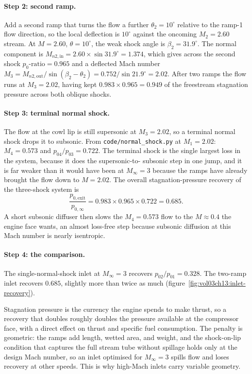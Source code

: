 \paragraph{Step 2: second ramp.} Add a second ramp that turns the flow
a further $\theta_2 = 10^{\circ}$ relative to the ramp-1 flow
direction, so the local deflection is $10^{\circ}$ against the
oncoming $M_2 = 2.60$ stream. At $M = 2.60$, $\theta = 10^{\circ}$, the
weak shock angle is $\beta_2 = 31.9^{\circ}$. The normal component is
$M_{n2,\text{in}} = 2.60 \times \sin 31.9^{\circ} = 1.374$, which gives
across the second shock $p_{0}\text{-ratio} = 0.965$ and a deflected
Mach number $M_3 = M_{n2,\text{out}}/\sin(\beta_2 - \theta_2) =
0.752/\sin 21.9^{\circ} = 2.02$. After two ramps the flow runs at
$M_3 = 2.02$, having kept $0.983 \times 0.965 = 0.949$ of the
freestream stagnation pressure across both oblique shocks.



\paragraph{Step 3: terminal normal shock.} The flow at the cowl lip is
still supersonic at $M_3 = 2.02$, so a terminal normal shock drops it
to subsonic. From \texttt{code/normal\_shock.py} at $M_1 = 2.02$:
$M_4 = 0.573$ and $p_{04}/p_{03} = 0.722$. The terminal shock is the
single largest loss in the system, because it does the supersonic-to-
subsonic step in one jump, and it is far weaker than it would have been
at $M_\infty = 3$ because the ramps have already brought the flow down
to $M = 2.02$. The overall stagnation-pressure recovery of the
three-shock system is
\[
\frac{p_{0,\text{exit}}}{p_{0,\infty}} = 0.983 \times 0.965 \times
0.722 = 0.685.
\]
A short subsonic diffuser then slows the $M_4 = 0.573$ flow to the
$M \approx 0.4$ the engine face wants, an almost loss-free step because
subsonic diffusion at this Mach number is nearly isentropic.

\paragraph{Step 4: the comparison.} The single-normal-shock inlet at
$M_\infty = 3$ recovers $p_{02}/p_{01} = 0.328$. The two-ramp inlet
recovers $0.685$, slightly more than twice as much
(figure~\ref{fig:vol03ch13:inlet-recovery}).

Stagnation pressure is the
currency the engine spends to make thrust, so a recovery that doubles
roughly doubles the pressure available at the compressor face, with a
direct effect on thrust and specific fuel consumption. The penalty is
geometric: the ramps add length, wetted area, and weight, and the
shock-on-lip condition that captures the full stream tube without
spillage holds only at the design Mach number, so an inlet optimised
for $M_\infty = 3$ spills flow and loses recovery at other speeds. This
is why high-Mach inlets carry variable geometry.


